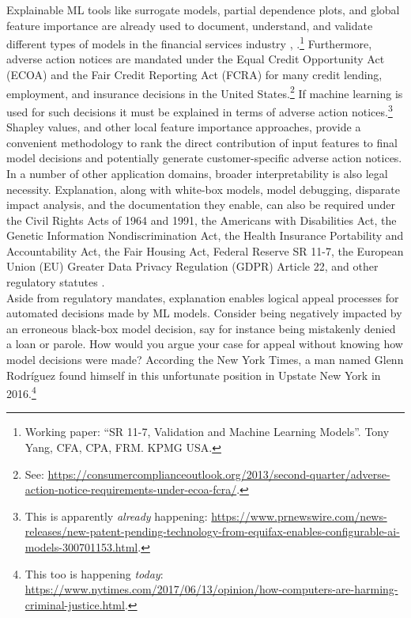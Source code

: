 \documentclass[fleqn]{article}
\begin{document}
Explainable ML tools like surrogate models, partial dependence plots, and global feature importance are already used to document, understand, and validate different types of models in the financial services industry \cite{lime-sup}, \cite{wf_xnn}.\footnote{Working paper: ``SR 11-7, Validation and Machine Learning Models''. 	
Tony Yang, CFA, CPA, FRM. KPMG USA.} Furthermore, adverse action notices are mandated under the Equal Credit Opportunity Act (ECOA) and the Fair Credit Reporting Act (FCRA) for many credit lending, employment, and insurance decisions in the United States.\footnote{See: \url{https://consumercomplianceoutlook.org/2013/second-quarter/adverse-action-notice-requirements-under-ecoa-fcra/}.} If machine learning is used for such decisions it must be explained in terms of adverse action notices.\footnote{This is apparently \textit{already} happening: \url{https://www.prnewswire.com/news-releases/new-patent-pending-technology-from-equifax-enables-configurable-ai-models-300701153.html}.} Shapley values, and other local feature importance approaches, provide a convenient methodology to rank the direct contribution of input features to final model decisions and potentially generate customer-specific adverse action notices. In a number of other application domains, broader interpretability is also legal necessity. Explanation, along with white-box models, model debugging, disparate impact analysis, and the documentation they enable, can also be required under the Civil Rights Acts of 1964 and 1991, the Americans with Disabilities Act, the Genetic Information Nondiscrimination Act, the Health Insurance Portability and Accountability Act, the Fair Housing Act, Federal Reserve SR 11-7, the European Union (EU) Greater Data Privacy Regulation (GDPR) Article 22, and other regulatory statutes \cite{ff_interpretability}.\\

Aside from regulatory mandates, explanation enables logical appeal processes for automated decisions made by ML models. Consider being negatively impacted by an erroneous black-box model decision, say for instance being mistakenly denied a loan or parole. How would you argue your case for appeal without knowing how model decisions were made? According the New York Times, a man named Glenn Rodr\'iguez found himself in this unfortunate position in Upstate New York in 2016.\footnote{This too is happening \textit{today}: \url{https://www.nytimes.com/2017/06/13/opinion/how-computers-are-harming-criminal-justice.html}.}\\
\end{document}

